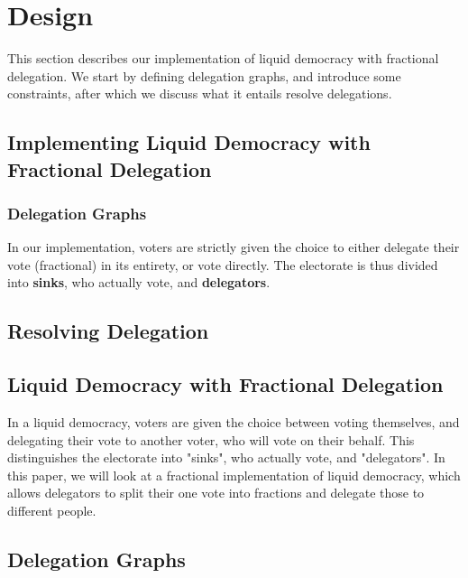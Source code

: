 \graphicspath{ {./figures/} }

\chapter{Design}
\label{sec:design}

This section describes our implementation of liquid democracy with fractional delegation. We start by defining delegation graphs, and introduce some constraints, after which we discuss what it entails resolve delegations.

\section{Implementing Liquid Democracy with Fractional Delegation}

\subsection{Delegation Graphs}

In our implementation, voters are strictly given the choice to either delegate their vote (fractional) in its entirety, or vote directly. The electorate is thus divided into \textbf{sinks}, who actually vote, and \textbf{delegators}. 

\section{Resolving Delegation}



\section{Liquid Democracy with Fractional Delegation}

In a liquid democracy, voters are given the choice between voting themselves, and delegating their vote to another voter, who will vote on their behalf. This distinguishes the electorate into "sinks", who actually vote, and "delegators".  In this paper, we will look at a fractional implementation of liquid democracy, which allows delegators to split their one vote into fractions and delegate those to different people.


 \section{Delegation Graphs}
 
